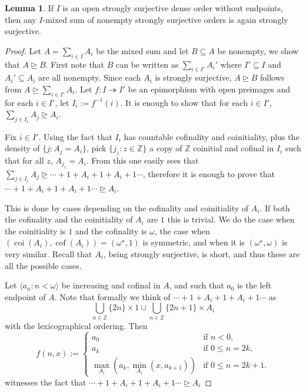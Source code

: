 \documentclass[10pt]{amsart}
\theoremstyle{definition}
\newtheorem{lemma}[theorem]{Lemma}
\theoremstyle{remark}
\newcommand{\seb}{\subseteq}
\newcommand{\tup}[1]{\langle#1\rangle}
\newcommand{\sgeq}{\trianglerighteq}
\newcommand{\sur}{\twoheadrightarrow}
\newcommand{\1}{\mathbbm{1}}
\DeclareMathOperator{\cof}{cof}
\DeclareMathOperator{\coi}{coi}
\begin{document}
\begin{lemma}\label{lem:srs-mix}
  If $I$ is an open strongly surjective dense order without endpoints,
  then any $I$-mixed sum of nonempty strongly surjective orders
  is again strongly surjective.
\end{lemma}
\begin{proof}
  Let $A = \sum_{i \in I}A_{i}$ be the mixed sum and let $B \seb A$ be
  nonempty, we show that $A \sgeq B$. First note that
  $B$ can be written as $\sum_{i \in I'}A_{i}'$ where $I' \seb I$ and
  $A_{i}' \seb A_{i}$ are all nonempty. Since each $A_{i}$ is strongly
  surjective, $A \sgeq B$ follows from
  $A \sgeq \sum_{i \in I'}A_{i}$.
  Let $f : I \sur I'$ be an epimorphism with open preimages and for
  each $i \in I'$, let $I_{i} := f^{-1}(i)$. It is enough to show that
  for each $i \in I'$, $\sum_{j \in I_{i}}A_{j} \sgeq A_{i}$.

    Fix $i \in I'$. Using the fact that $I_{i}$ has countable
  cofinality and coinitiality, plus the density of $\{j : A_{j} =
  A_{i}\}$, pick $\{j_{z} : z \in \mathbb{Z}\}$ a copy of $\mathbb{Z}$
  coinitial and cofinal in $I_{i}$ such that for all $z$, $A_{j_{z}} =
  A_{i}$. From this one easily sees that $\sum_{j \in I_{i}} A_{j} \sgeq
  \cdots + 1 + A_{i} + 1 + A_{i} + 1 \cdots$, therefore it is enough to prove
  that $\cdots + 1 + A_{i} + 1 + A_{i} + 1 \cdots \sgeq A_{i}$.

  This is done by cases depending on the
  cofinality and coinitiality of $A_{i}$. If both the
  cofinality and the coinitiality of $A_{i}$ are $1$ this is trivial. We
  do the case when the coinitiality is $1$ and the cofinality is $\omega$,
  the case when $(\coi(A_{i}),\cof(A_{i})) = (\omega^{\star},1)$ is symmetric,
  and when it is $(\omega^{\star},\omega)$ is very similar.
  Recall that $A_{i}$, being strongly surjective, is short, and thus these
  are all the possible cases.

  Let $\tup{a_{n} : n < \omega}$ be increasing and cofinal in $A$,
  and such that $a_{0}$ is the left endpoint of $A$. Note that formally
  we think of $\cdots + 1 + A_{i} + 1 + A_{i} + 1 \cdots$ as
  \[\bigcup_{n \in \mathbb{Z}}\{2n\}\times 1 \cup \bigcup_{n \in \mathbb{Z}}\{2n+1\}\times A_{i}\]
  with the lexicographical ordering.
  Then
  \[f(n,x) :=
    \begin{cases}
      a_{0}   &\text{if $n < 0$,}\\
      a_{k}   &\text{if $0 \le n = 2k$,}\\
      \max_{A_{i}}(a_{k},\min_{A_{i}}(x,a_{k+1})) &\text{if $0 \le n = 2k + 1$.}
    \end{cases}
  \]
  witnesses the fact that
  $\cdots + 1 + A_{i} + 1 + A_{i} + 1 \cdots \sgeq A_{i}$
\end{proof}
\end{document}
